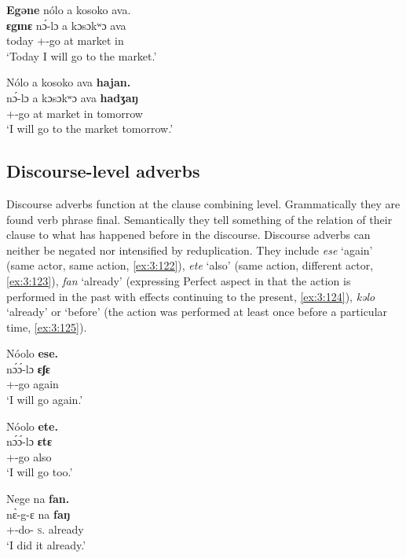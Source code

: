 \clearpage
\ea \label{ex:3:120}
\textbf{Egəne} nólo  a  kosoko  ava.\\
\gll  \textbf{ɛgɪnɛ}  n\'{ɔ}-lɔ     a  kɔsɔkʷɔ  ava\\
      today  {\oneS}+{\IFV}-go  at  market  in\\
\glt  ‘Today I will go to the market.’
\z

\ea \label{ex:3:121}
Nólo  a  kosoko  ava \textbf{hajan.}\\
\gll  n\'{ɔ}-lɔ   a  kɔsɔkʷɔ  ava  \textbf{hadʒaŋ}\\
      {\oneS}+{\IFV}-go  at  market  in  tomorrow\\
\glt  ‘I will go to the market tomorrow.’
\z

\subsection{Discourse-level adverbs}\label{sec:3.5.4}
\hypertarget{RefHeading1211221525720847}{}
Discourse adverbs function at the clause combining level. Grammatically they are found verb phrase final. Semantically they tell something of the relation of their clause to what has happened before in the discourse. Discourse adverbs can neither be negated nor intensified by reduplication. They include \textit{ese} ‘again’ (same actor, same action, \ref{ex:3:122}), \textit{ete} ‘also’ (same action, different actor, \ref{ex:3:123}), \textit{fan} ‘already’ (expressing Perfect %
aspect in that the action is performed in the past with effects continuing to the present, \ref{ex:3:124}), \textit{kəlo} ‘already’ or ‘before’ (the action was performed at least once before a particular time, \ref{ex:3:125}). 

\ea \label{ex:3:122}
Nóolo  \textbf{ese.}\\
\gll  n\'{ɔ}\'{ɔ}-lɔ     \textbf{ɛʃɛ}\\
      {\oneS}+{\POT}-go    again\\
\glt  ‘I will go again.’
\z

\ea \label{ex:3:123}
Nóolo  \textbf{ete.}\\
\gll  n\'{ɔ}\'{ɔ}-lɔ     \textbf{ɛtɛ}\\
      {\oneS}+{\POT}-go    also\\
\glt  ‘I will go too.’
\z

\ea \label{ex:3:124}
Nege  na  \textbf{fan.}\\
\gll  n\`{ɛ}-g-ɛ    na  \textbf{faŋ}\\
      {\oneS}+{\PFV}-do-{\CL}  \textsc{s}.{\DO}  already\\
\glt  ‘I did it already.’
\z

